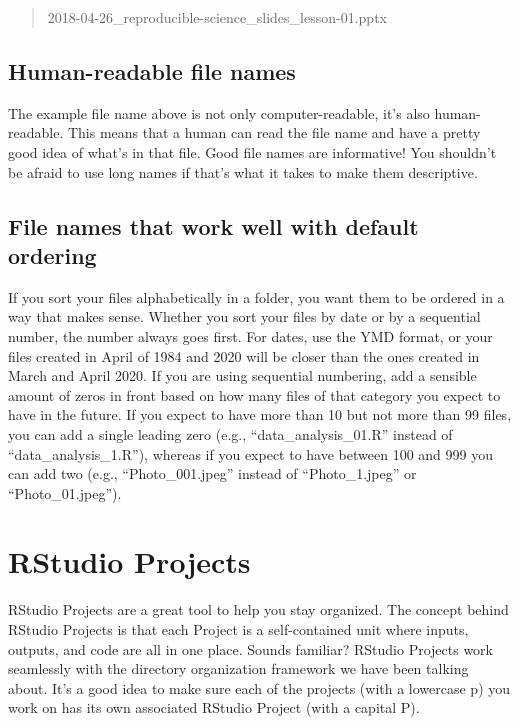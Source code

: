 \documentclass[
]{book}
\begin{document}
\begin{quote}
2018-04-26\_reproducible-science\_slides\_lesson-01.pptx
\end{quote}

\hypertarget{human-readable-file-names}{%
\subsection{Human-readable file names}\label{human-readable-file-names}}

The example file name above is not only computer-readable, it's also human-readable. This means that a human can read the file name and have a pretty good idea of what's in that file. Good file names are informative! You shouldn't be afraid to use long names if that's what it takes to make them descriptive.

\hypertarget{file-names-that-work-well-with-default-ordering}{%
\subsection{File names that work well with default ordering}\label{file-names-that-work-well-with-default-ordering}}

If you sort your files alphabetically in a folder, you want them to be ordered in a way that makes sense. Whether you sort your files by date or by a sequential number, the number always goes first. For dates, use the YMD format, or your files created in April of 1984 and 2020 will be closer than the ones created in March and April 2020. If you are using sequential numbering, add a sensible amount of zeros in front based on how many files of that category you expect to have in the future. If you expect to have more than 10 but not more than 99 files, you can add a single leading zero (e.g., ``data\_analysis\_01.R'' instead of ``data\_analysis\_1.R''), whereas if you expect to have between 100 and 999 you can add two (e.g., ``Photo\_001.jpeg'' instead of ``Photo\_1.jpeg'' or ``Photo\_01.jpeg'').

\hypertarget{rstudio-projects}{%
\section{RStudio Projects}\label{rstudio-projects}}

RStudio Projects are a great tool to help you stay organized. The concept behind RStudio Projects is that each Project is a self-contained unit where inputs, outputs, and code are all in one place. Sounds familiar? RStudio Projects work seamlessly with the directory organization framework we have been talking about. It's a good idea to make sure each of the projects (with a lowercase p) you work on has its own associated RStudio Project (with a capital P).
\end{document}
